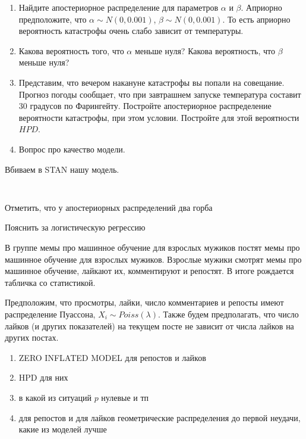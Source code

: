 \begin{problem}
\begin{enumerate} 
	\item Найдите апостериорное распределение для параметров $\alpha$ и $\beta$.  Априорно предположите, что $\alpha \sim N(0, 0.001)$,  $\beta \sim N(0, 0.001)$. То есть априорно вероятность катастрофы очень слабо зависит от температуры.
	
	\item Какова вероятность того, что $\alpha$ меньше нуля? Какова вероятность, что $\beta$ меньше нуля? 
	
	\item Представим, что вечером накануне катастрофы вы попали на совещание. Прогноз погоды сообщает, что при завтрашнем запуске температура составит $30$ градусов по Фарингейту. Постройте апостериорное распределение вероятности катастрофы, при этом условии. Постройте для этой вероятности $HPD$. 
	
	\item Вопрос про качество модели. 
	
\end{enumerate}
	\begin{sol} 
	Вбиваем в STAN нашу модель. 
	
\begin{verbatim}


\end{verbatim}
		
		
		
		
	Отметить, что у апостериорных распределений два горба 

	Пояснить за логистическую регрессию 
		
	\end{sol} 
\end{problem}


\begin{problem}
	В группе мемы про машинное обучение для взрослых мужиков постят мемы про машинное обучение для взрослых мужиков. Взрослые мужики смотрят мемы про машинное обучение, лайкают их, комментируют и репостят. В итоге рождается табличка со статистикой.
	
	Предположим, что просмотры, лайки, число комментариев и репосты имеют распределение Пуассона, $X_i \sim Poiss(\lambda)$. Также будем предполагать, что число лайков (и других показателей) на текущем посте не зависит от числа лайков на других постах.
	
	\begin{enumerate}
		\item  ZERO INFLATED MODEL для репостов и лайков 
		\item  HPD для них 
		\item  в какой из ситуаций $p$ нулевые и  тп
		\item  для репостов и для лайков геометрические распределения до первой неудачи, какие из моделей лучше
	\end{enumerate}

	\begin{sol} 
		
	\end{sol} 
\end{problem}


